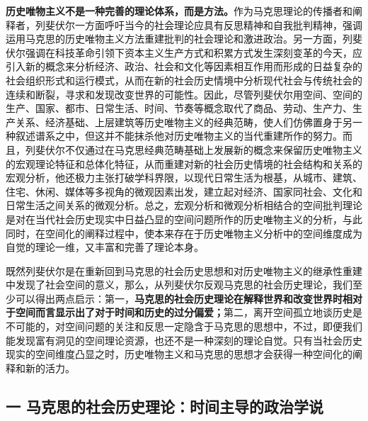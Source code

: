 \documentclass[UTF8, fontset = sourcesans, a4paper, oneside, zihao =
-4, scheme=chinese, no-math, space=true]{ctexbook}
\begin{document}
\textbf{历史唯物主义不是一种完善的理论体系，而是方法。}作为马克思理论的传播者和阐释者，列斐伏尔一方面呼吁当今的社会理论应具有反思精神和自我批判精神，强调运用马克思的历史唯物主义方法重建批判的社会理论和激进政治。另一方面，列斐伏尔强调在科技革命引领下资本主义生产方式和积累方式发生深刻变革的今天，应引入新的概念来分析经济、政治、社会和文化等因素相互作用而形成的日益复杂的社会组织形式和运行模式，从而在新的社会历史情境中分析现代社会与传统社会的连续和断裂，寻求和发现改变世界的可能性。因此，尽管列斐伏尔用空间、空间的生产、国家、都市、日常生活、时间、节奏等概念取代了商品、劳动、生产力、生产关系、经济基础、上层建筑等历史唯物主义的经典范畴，使人们仿佛置身于另一种叙述谱系之中，但这并不能抹杀他对历史唯物主义的当代重建所作的努力。而且，列斐伏尔不仅通过在马克思经典范畴基础上发展新的概念来保留历史唯物主义的宏观理论特征和总体化特征，从而重建对新的社会历史情境的社会结构和关系的宏观分析，他还极力主张打破学科界限，以现代日常生活为根基，从城市、建筑、住宅、休闲、媒体等多视角的微观因素出发，建立起对经济、国家同社会、文化和日常生活之间关系的微观分析。总之，宏观分析和微观分析相结合的空间批判理论是对在当代社会历史现实中日益凸显的空间问题所作的历史唯物主义的分析，与此同时，在空间化的阐释过程中，使本来存在于历史唯物主义分析中的空间维度成为自觉的理论一维，又丰富和完善了理论本身。

既然列斐伏尔是在重新回到马克思的社会历史思想和对历史唯物主义的继承性重建中发现了社会空间的意义，那么，从列斐伏尔反观马克思的社会历史理论，我们至少可以得出两点启示：第一，\textbf{马克思的社会历史理论在解释世界和改变世界时相对于空间而言显示出了对于时间和历史的过分偏爱；}第二，离开空间孤立地谈历史是不可能的，对空间问题的关注和反思一定隐含于马克思的思想中，不过，即便我们能发现富有洞见的空间理论资源，也还不是一种深刻的理论自觉。只有当社会历史现实的空间维度凸显之时，历史唯物主义和马克思的思想才会获得一种空间化的阐释和新的活力。

\subsection{一
马克思的社会历史理论：时间主导的政治学说}\label{part0010_split_002.htmlux5cux23c058}
\end{document}
